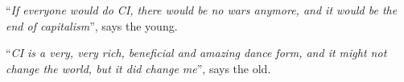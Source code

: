 \begin{displayquote}
    ``\textit{If everyone would do CI, there would be no wars anymore, and it would be the end of capitalism}'', says the young.
\end{displayquote}

\begin{displayquote}
    ``\textit{CI is a very, very rich, beneficial and amazing dance form, and it might not change the world, but it did change me}'', says the old.
\end{displayquote}

